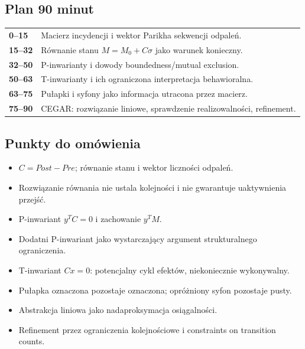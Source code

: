 \documentclass[11pt,a4paper]{article}
\begin{document}
\subsection{Plan 90 minut}
\begin{center}\small\begin{tabularx}{0.96\textwidth}{@{}>{\bfseries}p{18mm}X@{}}
0--15 & Macierz incydencji i wektor Parikha sekwencji odpaleń.\\
15--32 & Równanie stanu $M=M_0+C\sigma$ jako warunek konieczny.\\
32--50 & P-inwarianty i dowody boundedness/mutual exclusion.\\
50--63 & T-inwarianty i ich ograniczona interpretacja behawioralna.\\
63--75 & Pułapki i syfony jako informacja utracona przez macierz.\\
75--90 & CEGAR: rozwiązanie liniowe, sprawdzenie realizowalności, refinement.\\
\end{tabularx}\end{center}

\subsection{Punkty do omówienia}
\begin{itemize}
\item $C=Post-Pre$; równanie stanu i wektor liczności odpaleń.
\item Rozwiązanie równania nie ustala kolejności i nie gwarantuje uaktywnienia przejść.
\item P-inwariant $y^TC=0$ i zachowanie $y^TM$.
\item Dodatni P-inwariant jako wystarczający argument strukturalnego ograniczenia.
\item T-inwariant $Cx=0$: potencjalny cykl efektów, niekoniecznie wykonywalny.
\item Pułapka oznaczona pozostaje oznaczona; opróżniony syfon pozostaje pusty.
\item Abstrakcja liniowa jako nadaproksymacja osiągalności.
\item Refinement przez ograniczenia kolejnościowe i constraints on transition counts.
\end{itemize}
\end{document}
